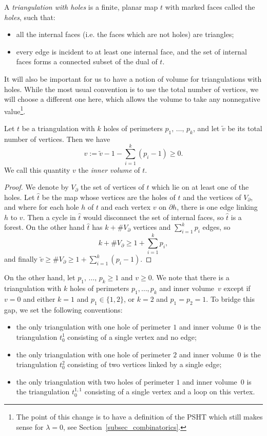\documentclass[AHL,Unicode,longabstracts,published]{cedram}
\begin{document}
A \emph{triangulation with holes} is a finite, planar map $t$ with marked faces called the \emph{holes}, such that:
\begin{itemize}
\item all the internal faces (i.e. the faces which are not holes) are triangles;
\item every edge is incident to at least one internal face, and the set of internal faces forms a connected subset of the dual of $t$.
\end{itemize}
It will also be important for us to have a notion of volume for triangulations with holes. While the most usual convention is to use the total number of vertices, we will choose a different one here, which allows the volume to take any nonnegative value\footnote{The point of this change is to have a definition of the PSHT which still makes sense for $\lambda=0$, see Section~\ref{subsec_combinatorics}.}.

\begin{lemm}
Let $t$ be a triangulation with $k$ holes of perimeters $p_1,\, \dots,\, p_k$, and let $\widetilde{v}$ be its total number of vertices. Then we have
\begin{equation}\label{eqn_defn_inner_volume}
v := \widetilde{v}-1-\sum_{i=1}^k (p_i-1) \geq 0.
\end{equation}
We call this quantity $v$ the \emph{inner volume} of $t$.
\end{lemm}

\begin{proof}
We denote by $V_{\partial}$ the set of vertices of $t$ which lie on at least one of the holes. Let $\widehat{t}$ be the map whose vertices are the holes of $t$ and the vertices of $V_{\partial}$, and where for each hole $h$ of $t$ and each vertex $v$ on $\partial h$, there is one edge linking $h$ to $v$. Then a cycle in $\widehat{t}$ would disconnect the set of internal faces, so $\widehat{t}$ is a forest. On the other hand $\widehat{t}$ has $k+\# V_{\partial}$ vertices and $\sum_{i=1}^k p_i$ edges, so
\[
k+ \# V_{\partial} \geq 1+\sum_{i=1}^k p_i,
\]
and finally $\widetilde{v} \geq \# V_{\partial} \geq 1+\sum_{i=1}^k (p_i-1)$.
\end{proof}

On the other hand, let $p_1,\,\dots,\, p_k \geq 1$ and $v \geq 0$. We note that there is a triangulation with $k$ holes of perimeters $p_1, \dots, p_k$ and inner volume~$v$ except if $v=0$ and either $k=1$ and $p_1 \in \{1,2\}$, or $k=2$ and $p_1=p_2=1$. To bridge this gap, we set the following conventions:
\begin{itemize}
\item the only triangulation with one hole of perimeter $1$ and inner volume~$0$ is the triangulation $t^1_0$ consisting of a single vertex and no edge;
\item the only triangulation with one hole of perimeter $2$ and inner volume~$0$ is the triangulation $t^2_0$ consisting of two vertices linked by a single edge;
\item the only triangulation with two holes of perimeter $1$ and inner volume~$0$ is the triangulation $t^{1,1}_0$ consisting of a single vertex and a loop on this vertex.
\end{itemize}
\end{document}
